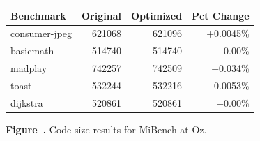 \par\vspace{1.2em}

\begin{center}
{\normalfont\normalsize
\setlength{\tabcolsep}{5pt}
\renewcommand{\arraystretch}{1.08}
\begin{tabular}{@{}lrrr@{}}
\toprule
Benchmark & Original & Optimized & Pct Change \\
\midrule
consumer-jpeg & 621068 & 621096 & +0.0045\% \\
basicmath     & 514740 & 514740 & +0.00\% \\
madplay       & 742257 & 742509 & +0.034\% \\
toast         & 532244 & 532216 & -0.0053\% \\
dijkstra      & 520861 & 520861 & +0.00\% \\
\bottomrule
\end{tabular}
}
\end{center}

\vspace{0.12em}

\label{fig:figure14}

\begin{center}
\small\textbf{Figure~\thefigure.} Code size results for MiBench at Oz.
\end{center}

\par\vspace{1.2em}
